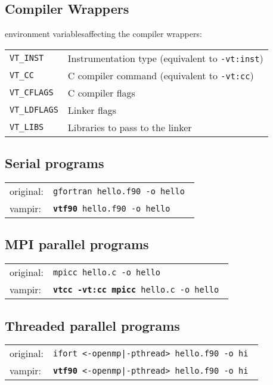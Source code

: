 \begin{multicols}{3}
\section{Compiler Wrappers}
environment variablesaffecting the compiler wrappers:\\
\begin{tabular}{@{}ll@{}}
\texttt{VT\_INST}            & Instrumentation type (equivalent to \texttt{-vt:inst})\\
\texttt{VT\_CC}              & C compiler command (equivalent to \texttt{-vt:cc})\\
\texttt{VT\_CFLAGS}          & C compiler flags\\
\texttt{VT\_LDFLAGS}         & Linker flags\\
\texttt{VT\_LIBS}            & Libraries to pass to the linker
\end{tabular}

\subsection{Serial programs}
\begin{tabular}{@{}ll@{}}
original:              &  \tt gfortran hello.f90 -o hello  \\
vampir:  &  \tt \textbf{vtf90} hello.f90 -o hello  \\
\end{tabular}

\subsection{MPI parallel programs}
\begin{tabular}{@{}ll@{}}
original:              &  \tt mpicc hello.c -o hello  \\
vampir:  &  \tt \textbf{vtcc -vt:cc mpicc} hello.c -o hello  \\
\end{tabular}

\subsection{Threaded parallel programs}
\begin{tabular}{@{}ll@{}}
original:              &  \tt ifort <-openmp|-pthread> hello.f90 -o hi \\
vampir:  &  \tt \textbf{vtf90} <-openmp|-pthread> hello.f90 -o hi \\
\end{tabular}


\end{multicols}
